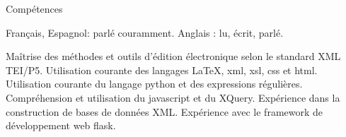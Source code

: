 











\begin{rubric}{Compétences}
                    \entry*
                    
                Français, Espagnol: parlé couramment. Anglais : lu,
                    écrit, parlé.
                    \entry*
                    
                Maîtrise des méthodes et outils d'édition électronique
                    selon le standard XML TEI/P5. Utilisation courante des
                    langages \LaTeX, xml, xsl, css et html. Utilisation courante
                    du langage python et des expressions régulières.
                    Compréhension et utilisation du javascript et du XQuery.
                    Expérience dans la construction de bases de données XML.
                    Expérience avec le framework de développement web
                    flask.\end{rubric}



